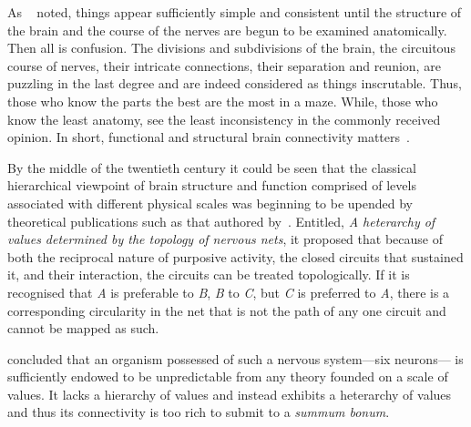 \documentclass[11pt,3p,twocolumn]{JMN}
\begin{document}
As ~\citet{bell11} noted, things appear sufficiently simple and consistent until the structure of the brain and the course of the nerves are begun to be examined anatomically. Then all is confusion. The divisions and subdivisions of the brain, the circuitous course of nerves, their intricate connections, their separation and reunion, are puzzling in the last degree and are indeed considered as things inscrutable. Thus, those who know the parts the best are the most in a maze. While, those who know the least anatomy, see the least inconsistency in the commonly received opinion. In short, functional and structural brain connectivity matters~\citep[see, for example,][]{gili18}.

By the middle of the twentieth century it could be seen that the classical hierarchical viewpoint of brain structure and function comprised of levels associated with different physical scales was beginning to be upended by theoretical publications such as that authored by~\citet{mcculloch45a}. Entitled, {\it{A heterarchy of values determined by the topology of nervous nets}}, it proposed that because of both the reciprocal nature of purposive activity, the closed circuits that sustained it, and their interaction, the circuits can be treated topologically. If it is recognised that {\it{A}} is preferable to {\it{B}}, {\it{B}} to {\it{C}}, but {\it{C}} is preferred to {\it{A}}, there is a  corresponding circularity in the net that is not the path of any one circuit and cannot be mapped as such.

\citeauthor{mcculloch45a} concluded that an organism possessed of such a nervous system---six neurons--- is sufficiently endowed to be unpredictable from any theory founded on a scale of values. It lacks a hierarchy of values and instead exhibits a heterarchy of values and thus its connectivity is too rich to submit to a {\it{summum bonum}}.
\end{document}
